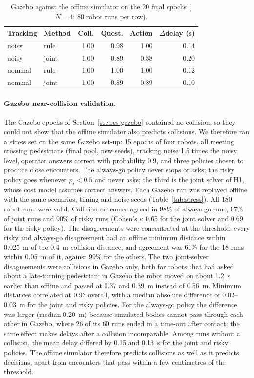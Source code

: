 \documentclass[a4paper,fleqn]{cas-dc}
\begin{document}
\begin{table}
\centering
\caption{Gazebo against the offline simulator on the 20 final epochs ($N = 4$; 80 robot runs per row).}
\label{tab:gazebo}
\begin{tabular*}{\columnwidth}{@{\extracolsep{\fill}}llrrrr}
\toprule
Tracking & Method & Coll. & Quest. & Action & $\Delta$delay (s) \\
\midrule
noisy & rule & 1.00 & 0.98 & 1.00 & 0.14 \\
noisy & joint & 1.00 & 0.89 & 0.88 & 0.20 \\
nominal & rule & 1.00 & 1.00 & 1.00 & 0.12 \\
nominal & joint & 1.00 & 0.89 & 0.89 & 0.10 \\
\bottomrule
\end{tabular*}
\end{table}

\paragraph{Gazebo near-collision validation.} The Gazebo epochs of Section~\ref{sec:res-gazebo} contained no collision, so they could not show that the offline simulator also predicts collisions. We therefore ran a stress set on the same Gazebo set-up: 15 epochs of four robots, all meeting crossing pedestrians (final pool, new seeds), tracking noise 1.5 times the noisy level, operator answers correct with probability 0.9, and three policies chosen to produce close encounters. The always-go policy never stops or asks; the risky policy goes whenever $p_i < 0.5$ and never asks; the third is the joint solver of H1, whose cost model assumes correct answers. Each Gazebo run was replayed offline with the same scenarios, timing and noise seeds (Table~\ref{tab:stress}). All 180 robot runs were valid. Collision outcomes agreed in 98\% of always-go runs, 97\% of joint runs and 90\% of risky runs (Cohen's $\kappa$ 0.65 for the joint solver and 0.69 for the risky policy). The disagreements were concentrated at the threshold: every risky and always-go disagreement had an offline minimum distance within \SI{0.025}{m} of the \SI{0.4}{m} collision distance, and agreement was 61\% for the 18 runs within \SI{0.05}{m} of it, against 99\% for the others. The two joint-solver disagreements were collisions in Gazebo only, both for robots that had asked about a late-turning pedestrian; in Gazebo the robot moved on about \SI{1.2}{s} earlier than offline and passed at 0.37 and \SI{0.39}{m} instead of \SI{0.56}{m}. Minimum distances correlated at 0.93 overall, with a median absolute difference of 0.02--\SI{0.03}{m} for the joint and risky policies. For the always-go policy the difference was larger (median \SI{0.20}{m}) because simulated bodies cannot pass through each other in Gazebo, where 26 of its 60 runs ended in a time-out after contact; the same effect makes delays after a collision incomparable. Among runs without a collision, the mean delay differed by 0.15 and \SI{0.13}{s} for the joint and risky policies. The offline simulator therefore predicts collisions as well as it predicts decisions, apart from encounters that pass within a few centimetres of the threshold.
\end{document}
